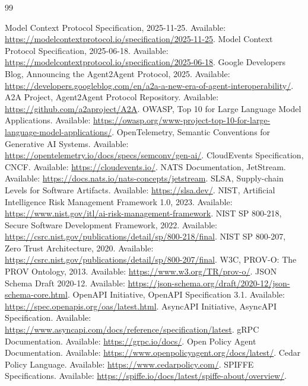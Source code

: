\documentclass[10pt,journal,onecolumn]{IEEEtran}
\begin{document}
\begin{thebibliography}{99}

 Model Context Protocol Specification, 2025-11-25. Available: \url{https://modelcontextprotocol.io/specification/2025-11-25}.
 Model Context Protocol Specification, 2025-06-18. Available: \url{https://modelcontextprotocol.io/specification/2025-06-18}.
 Google Developers Blog, Announcing the Agent2Agent Protocol, 2025. Available: \url{https://developers.googleblog.com/en/a2a-a-new-era-of-agent-interoperability/}.
 A2A Project, Agent2Agent Protocol Repository. Available: \url{https://github.com/a2aproject/A2A}.
 OWASP, Top 10 for Large Language Model Applications. Available: \url{https://owasp.org/www-project-top-10-for-large-language-model-applications/}.
 OpenTelemetry, Semantic Conventions for Generative AI Systems. Available: \url{https://opentelemetry.io/docs/specs/semconv/gen-ai/}.
 CloudEvents Specification, CNCF. Available: \url{https://cloudevents.io/}.
 NATS Documentation, JetStream. Available: \url{https://docs.nats.io/nats-concepts/jetstream}.
 SLSA, Supply-chain Levels for Software Artifacts. Available: \url{https://slsa.dev/}.
 NIST, Artificial Intelligence Risk Management Framework 1.0, 2023. Available: \url{https://www.nist.gov/itl/ai-risk-management-framework}.
 NIST SP 800-218, Secure Software Development Framework, 2022. Available: \url{https://csrc.nist.gov/publications/detail/sp/800-218/final}.
 NIST SP 800-207, Zero Trust Architecture, 2020. Available: \url{https://csrc.nist.gov/publications/detail/sp/800-207/final}.
 W3C, PROV-O: The PROV Ontology, 2013. Available: \url{https://www.w3.org/TR/prov-o/}.
 JSON Schema Draft 2020-12. Available: \url{https://json-schema.org/draft/2020-12/json-schema-core.html}.
 OpenAPI Initiative, OpenAPI Specification 3.1. Available: \url{https://spec.openapis.org/oas/latest.html}.
 AsyncAPI Initiative, AsyncAPI Specification. Available: \url{https://www.asyncapi.com/docs/reference/specification/latest}.
 gRPC Documentation. Available: \url{https://grpc.io/docs/}.
 Open Policy Agent Documentation. Available: \url{https://www.openpolicyagent.org/docs/latest/}.
 Cedar Policy Language. Available: \url{https://www.cedarpolicy.com/}.
 SPIFFE Specifications. Available: \url{https://spiffe.io/docs/latest/spiffe-about/overview/}.

\end{thebibliography}
\end{document}
